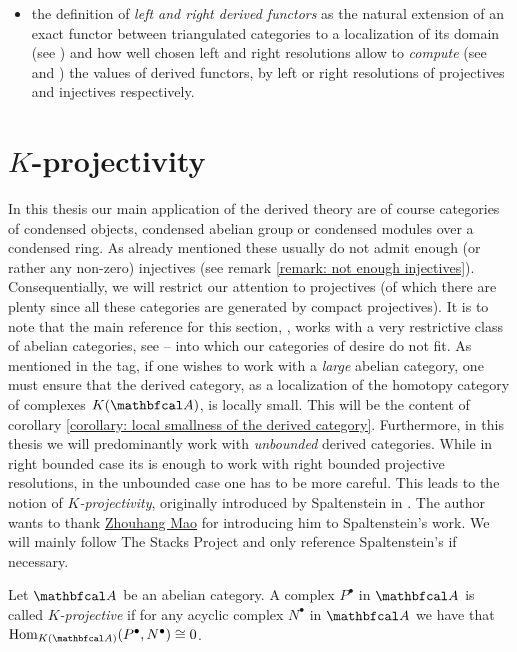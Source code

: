 \begin{itemize}
	\item
	the definition of \emph{left and right derived functors} as the natural extension of an exact functor between triangulated categories to a localization of its domain (see \cite[\href{https://stacks.math.columbia.edu/tag/05S7}{Tag 05S7}]{stacks-project}) and how well chosen left and right resolutions allow to \emph{compute} (see \cite[\href{https://stacks.math.columbia.edu/tag/05SX}{Tag 05SX}]{stacks-project} and \cite[\href{https://stacks.math.columbia.edu/tag/06XN}{Tag 06XN}]{stacks-project}) the values of derived functors, \eg by left or right resolutions of projectives and injectives respectively.
\end{itemize}

\section{\texorpdfstring{$K$}{K}-projectivity}
\label{section: K-projectivity}

In this thesis our main application of the derived theory are of course categories of condensed objects, \eg condensed abelian group or condensed modules over a condensed ring. As already mentioned these usually do not admit enough (or rather any non-zero) injectives (see remark \ref{remark: not enough injectives}). Consequentially, we will restrict our attention to projectives (of which there are plenty since all these categories are generated by compact projectives). It is to note that the main reference for this section, \cite[The Stacks Project]{stacks-project}, works with a very restrictive class of abelian categories, see \cite[\href{https://stacks.math.columbia.edu/tag/09PA}{Tag 09PA}]{stacks-project} -- into which our categories of desire do not fit. As mentioned in the tag, if one wishes to work with a \emph{large} abelian category, one must ensure that the derived category, as a localization of the homotopy category of complexes $\homotopyCategoryOfComplexes{\category{A}}$, is locally small. This will be the content of corollary \ref{corollary: local smallness of the derived category}. Furthermore, in this thesis we will predominantly work with \emph{unbounded} derived categories. While in right bounded case its is enough to work with right bounded projective resolutions, in the unbounded case one has to be more careful. This leads to the notion of \emph{$K$-projectivity}, originally introduced by Spaltenstein in \cite{spaltenstein}. The author wants to thank \href{https://zmao-math.github.io/}{Zhouhang Mao} for introducing him to Spaltenstein's work. We will mainly follow The Stacks Project \cite{stacks-project} and only reference Spaltenstein's \cite{spaltenstein} if necessary.
\begin{definition}
	
	Let $\category{A}$ be an abelian category. A complex $P^\bullet$ in $\category{A}$ is called \emph{$K$-projective} if for any acyclic complex $N^\bullet$ in $\category{A}$ we have that $\Hom_\homotopyCategoryOfComplexes{\category{A}}(P^\bullet, N^\bullet)\cong 0$.
\end{definition}

